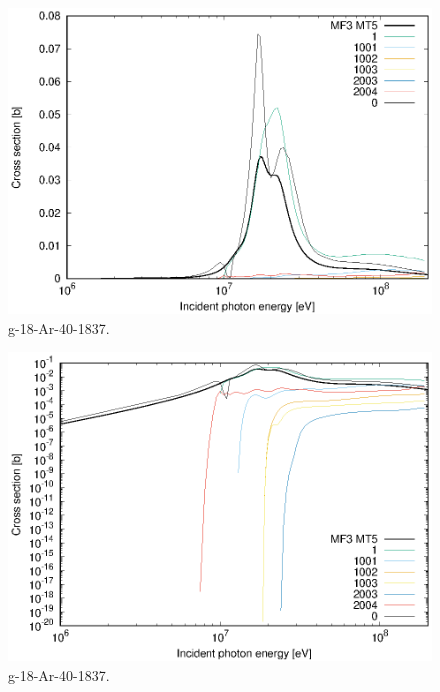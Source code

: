 \begin{figure}
 \includegraphics[width=\linewidth]{eps/g_18-Ar-40_1837.eps}
  \caption{g-18-Ar-40-1837.}
\end{figure}
\begin{figure}
 \includegraphics[width=\linewidth]{eps-log/g_18-Ar-40_1837.eps}
 \caption{g-18-Ar-40-1837.}
\end{figure}
\newpage \clearpage

